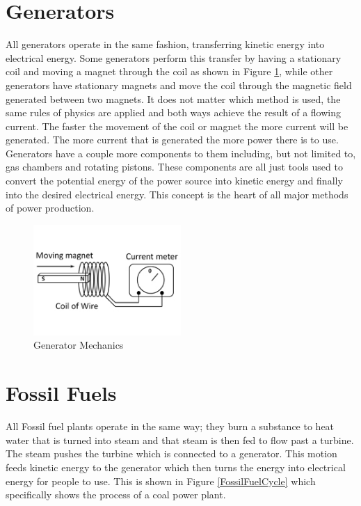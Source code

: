 \documentclass[msc,oneside]{ubcthesis}%
\begin{document}
\section{Generators}
  
  All generators operate in the same fashion, transferring kinetic energy into electrical energy. Some generators perform this transfer by having a stationary coil and moving a magnet through the coil as shown in Figure \ref{Induction}, while other generators have stationary magnets and move the coil through the magnetic field generated between two magnets. It does not matter which method is used, the same rules of physics are applied and both ways achieve the result of a flowing current. The faster the movement of the coil or magnet the more current will be generated. 
  The more current that is generated the more power there is to use. Generators have a couple more components to them including, but not limited to, gas chambers and rotating pistons. These components are all just tools used to convert the potential energy of the power source into kinetic energy and finally into the desired electrical energy. This concept is the heart of all major methods of power production.

  \begin{figure}[hbt]{\label{Induction} }
  \begin{center}
    \includegraphics[width=0.5\textwidth]{Induction}
    \caption[Generator Mechanics]{Generator Mechanics \cite{Current}}  
  \end{center}
\end{figure}

\newpage
  \section{Fossil Fuels}

  All Fossil fuel plants operate in the same way; they burn a substance to heat water that is turned into 
  steam and that steam is then fed to flow past a turbine. The steam pushes the turbine which is connected to a generator. This motion feeds kinetic energy to the generator which then turns the energy into electrical energy for people to use. This is shown in Figure \ref{FossilFuelCycle} which specifically shows the process of a coal power plant. 
\end{document}
